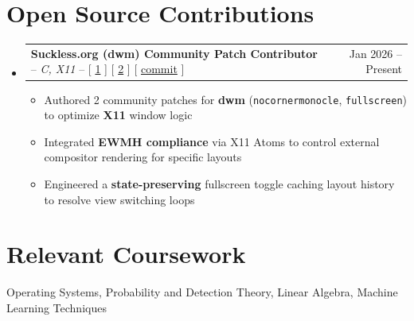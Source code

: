 \documentclass[letterpaper,11pt]{article}
\makeatletter
\newcommand{\resumeItem}[1]{\item\small{{#1 \vspace{-2pt}}}}
\newcommand{\resumeProjectHeading}[2]{
    \item
    \begin{tabular*}{0.97\textwidth}{l@{\extracolsep{\fill}}r}
      \small#1 & #2 \\
    \end{tabular*}\vspace{-7pt}
}
\newcommand{\resumeSubHeadingListStart}{\begin{itemize}[leftmargin=0.15in, label={}]}
\newcommand{\resumeSubHeadingListEnd}{\end{itemize}}
\newcommand{\resumeItemListStart}{\begin{itemize}}
\newcommand{\resumeItemListEnd}{\end{itemize}\vspace{-5pt}}
\makeatother
\begin{document}
\section{Open Source Contributions}
    \resumeSubHeadingListStart
      \resumeProjectHeading
      {\textbf{Suckless.org (dwm) Community Patch Contributor} -- \emph{C, X11} -- [ \href{https://dwm.suckless.org/patches/nocornermonocle/}{1} ] [ \href{https://dwm.suckless.org/patches/fullscreen/}{2} ] [ \href{https://git.suckless.org/sites/commit/ec43643a1702093a1a8042db9e7ac656fb10bfcb.html}{commit} ]}{Jan 2026 -- Present}
          \resumeItemListStart
    \resumeItem{Authored 2 community patches for \textbf{dwm} (\texttt{nocornermonocle}, \texttt{fullscreen}) to optimize \textbf{X11} window logic}
    \resumeItem{Integrated \textbf{EWMH compliance} via X11 Atoms to control external compositor rendering for specific layouts}
    \resumeItem{Engineered a \textbf{state-preserving} fullscreen toggle caching layout history to resolve view switching loops}
          \resumeItemListEnd

    \resumeSubHeadingListEnd

\section{Relevant Coursework}
 \begin{itemize}[leftmargin=0.15in, label={}]
    \small{\item{
     {Operating Systems, Probability and Detection Theory, Linear Algebra, Machine Learning Techniques}
    }}
 \end{itemize}
\end{document}
